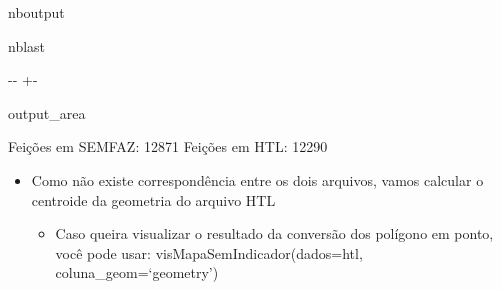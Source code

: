 \documentclass[letterpaper,10pt,brazil]{sphinxmanual}
\newlength\nbsphinxcodecellspacing
\begin{document}
\begin{sphinxuseclass}{nboutput}
\begin{sphinxuseclass}{nblast}
{

\kern-\sphinxverbatimsmallskipamount\kern-\baselineskip
\kern+\FrameHeightAdjust\kern-\fboxrule
\vspace{\nbsphinxcodecellspacing}

\begin{sphinxuseclass}{output_area}
\begin{sphinxuseclass}{}


\begin{sphinxVerbatim}[commandchars=\\\{\}]
Feições em SEMFAZ: 12871
Feições em HTL: 12290
\end{sphinxVerbatim}



\end{sphinxuseclass}
\end{sphinxuseclass}
}

\end{sphinxuseclass}
\end{sphinxuseclass}\begin{itemize}
\item {} 
\sphinxAtStartPar
Como não existe correspondência entre os dois arquivos, vamos calcular o centroide da geometria do arquivo HTL
\begin{itemize}
\item {} 
\sphinxAtStartPar
Caso queira visualizar o resultado da conversão dos polígono em ponto, você pode usar: visMapaSemIndicador(dados=htl, coluna\_geom=‘geometry’)

\end{itemize}

\end{itemize}
\end{document}
